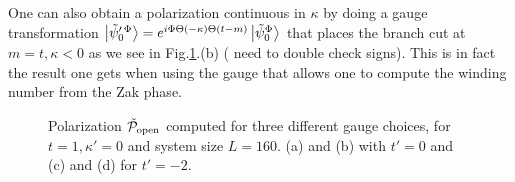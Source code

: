 \documentclass[twocolumn,amsmath,longbibliography,amssymb,superscriptaddress]{revtex4-1}
\newcommand{\carlos}[1]{{\color{red} #1}}
\begin{document}
One can also obtain a polarization continuous in $\kappa$ by doing a gauge transformation $\ket{\tilde{\psi}^{\prime \,\Phi}_{0}}=e^{ i \Phi \Theta(-\kappa)\Theta(t-m)}\ket{\tilde{\psi}^{\Phi}_{0}}$ that places the branch cut at $m=t,\kappa < 0$ as we see in Fig.\ref{ssh_chern}.(b)  (\carlos{need to double check signs}). This is in fact the result one gets when using the gauge that allows one to compute the winding number from the Zak phase. 

\begin{figure}[t]
	\centering
	\hspace{0mm}
	
	\caption{Polarization $\tilde{\mathcal{P}}_{\rm open}$ computed for three different gauge choices, for $t=1,\kappa'=0$ and system size $L=160$. (a) and (b) with $t'=0$ and (c) and (d) for $t'=-2$. }
	\label{ssh_chern}
\end{figure}
\end{document}
